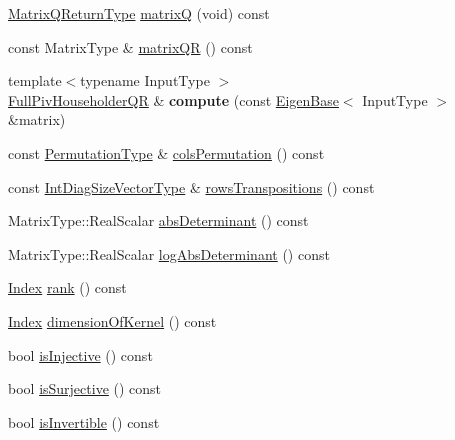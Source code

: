 \begin{DoxyCompactItemize}
\item 
\hyperlink{group___q_r___module_struct_eigen_1_1internal_1_1_full_piv_householder_q_r_matrix_q_return_type}{Matrix\+Q\+Return\+Type} \hyperlink{group___q_r___module_ad26dd2d3c002939771d2375e4e051c28}{matrixQ} (void) const
\item 
const Matrix\+Type \& \hyperlink{group___q_r___module_a9c16411e5d8f1fc634a5797018d5aa3e}{matrix\+QR} () const
\item 
\mbox{\label{group___q_r___module_aadf0f38d53a132dd246abe527175d058}} 
{\footnotesize template$<$typename Input\+Type $>$ }\\\hyperlink{group___q_r___module_class_eigen_1_1_full_piv_householder_q_r}{Full\+Piv\+Householder\+QR} \& {\bfseries compute} (const \hyperlink{group___core___module_struct_eigen_1_1_eigen_base}{Eigen\+Base}$<$ Input\+Type $>$ \&matrix)
\item 
const \hyperlink{group___core___module}{Permutation\+Type} \& \hyperlink{group___q_r___module_abeda6d91e196c13d4dd8b7542fef3e17}{cols\+Permutation} () const
\item 
const \hyperlink{group___core___module}{Int\+Diag\+Size\+Vector\+Type} \& \hyperlink{group___q_r___module_abebbfc0ca6e3dd285a0ad0c907abb093}{rows\+Transpositions} () const
\item 
Matrix\+Type\+::\+Real\+Scalar \hyperlink{group___q_r___module_a1029e1ccc70bb8669043c5775e7f3b75}{abs\+Determinant} () const
\item 
Matrix\+Type\+::\+Real\+Scalar \hyperlink{group___q_r___module_aafde38918912c9b562f44b0fc3b22589}{log\+Abs\+Determinant} () const
\item 
\hyperlink{namespace_eigen_a62e77e0933482dafde8fe197d9a2cfde}{Index} \hyperlink{group___q_r___module_aeae555220f46477818ccc94aca2de770}{rank} () const
\item 
\hyperlink{namespace_eigen_a62e77e0933482dafde8fe197d9a2cfde}{Index} \hyperlink{group___q_r___module_a3b5fe5edc66acc01c45b16e728470aa0}{dimension\+Of\+Kernel} () const
\item 
bool \hyperlink{group___q_r___module_a6776788011026b0f63192485a59deaed}{is\+Injective} () const
\item 
bool \hyperlink{group___q_r___module_aa3593db4708ce9079b0bdf219b99f57e}{is\+Surjective} () const
\item 
bool \hyperlink{group___q_r___module_aeb1d779ec22ec68a5a28d4235db02ec1}{is\+Invertible} () const
\item 

\end{DoxyCompactItemize}
